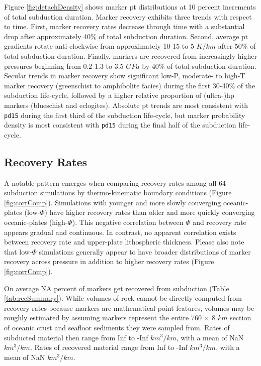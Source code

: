 Figure \ref{fig:detachDensity} shows marker \gls{pt} distributions at 10 percent increments of total subduction duration. Marker recovery exhibits three trends with respect to time. First, marker recovery rates decrease through time with a substantial drop after approximately 40\% of total subduction duration. Second, average \gls{pt} gradients rotate anti-clockwise from approximately 10-15 to 5 \(K/km\) after 50\% of total subduction duration. Finally, markers are recovered from increasingly higher pressures beginning from 0.2-1.3 to 3.5 \(GPa\) by 40\% of total subduction duration. Secular trends in marker recovery show significant low-P, moderate- to high-T marker recovery (greenschist to amphibolite facies) during the first 30-40\% of the subduction life-cycle, followed by a higher relative proportion of (ultra-)\gls{hp} markers (blueschist and eclogites). Absolute \gls{pt} trends are most consistent with \texttt{pd15} during the first third of the subduction life-cycle, but marker probability density is most consistent with \texttt{pd15} during the final half of the subduction life-cycle.

\hypertarget{recovery-rates}{%
\subsection{Recovery Rates}\label{recovery-rates}}

A notable pattern emerges when comparing recovery rates among all 64 subduction simulations by thermo-kinematic boundary conditions (Figure \ref{fig:corrComp}). Simulations with younger and more slowly converging oceanic-plates (low-\(\Phi\)) have higher recovery rates than older and more quickly converging oceanic-plates (high-\(\Phi\)). This negative correlation between \(\Phi\) and recovery rate appears gradual and continuous. In contrast, no apparent correlation exists between recovery rate and upper-plate lithospheric thickness. Please also note that low-\(\Phi\) simulations generally appear to have broader distributions of marker recovery across pressure in addition to higher recovery rates (Figure \ref{fig:corrComp}).

On average NA percent of markers get recovered from subduction (Table \ref{tab:recSummary}). While volumes of rock cannot be directly computed from recovery rates because markers are mathematical point features, volumes may be roughly estimated by assuming markers represent the entire 760 \(\times\) 8 \(km\) section of oceanic crust and seafloor sediments they were sampled from. Rates of subducted material then range from Inf to -Inf \(km^3/km\), with a mean of NaN \(km^3/km\). Rates of recovered material range from Inf to -Inf \(km^3/km\), with a mean of NaN \(km^3/km\).

